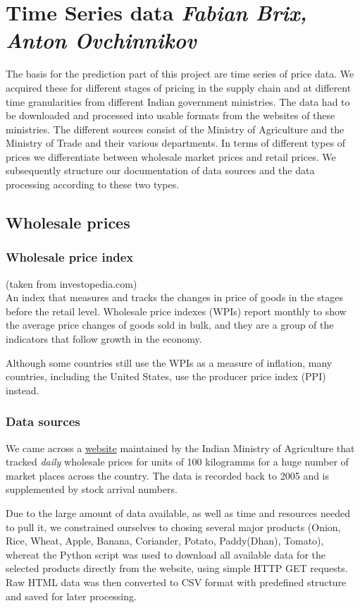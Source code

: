 \section*{Time Series data \footnotesize\emph{Fabian Brix, Anton Ovchinnikov}}
The basis for the prediction part of this project are time series of price data. We acquired these for different stages of pricing in the supply chain and at different time granularities from different Indian government ministries. The data had to be downloaded and processed into usable formats from the websites of these ministries. The different sources consist of the Ministry of Agriculture and the Ministry of Trade and their various departments. In terms of different types of prices we differentiate between wholesale market prices and retail prices. We subsequently structure our documentation of data sources and the data processing according to these two types.

\subsection*{Wholesale prices}

\subsubsection*{Wholesale price index}
(taken from investopedia.com)\\
An index that measures and tracks the changes in price of goods in the stages before the retail level. Wholesale price indexes (WPIs) report monthly to show the average price changes of goods sold in bulk, and they are a group of the indicators that follow growth in the economy.\par
Although some countries still use the WPIs as a measure of inflation, many countries, including the United States, use the producer price index (PPI) instead.\par

\subsubsection*{Data sources}
We came across a \href{http://agmarknet.nic.in/}{website} maintained by the Indian Ministry of Agriculture that tracked \emph{daily} wholesale prices for units of 100 kilogramms for a huge number of market places across the country. The data is recorded back to 2005 and is supplemented by stock arrival numbers.\par
Due to the large amount of data available, as well as time and resources needed to pull it, we constrained ourselves to chosing several major products (Onion, Rice, Wheat, Apple, Banana, Coriander, Potato, Paddy(Dhan), Tomato), whereat the Python script was used to download all available data for the selected products directly from the website, using simple HTTP GET requests. Raw HTML data was then converted to CSV format with predefined structure and saved for later processing.

